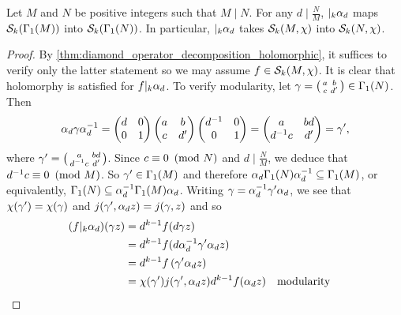     \begin{proposition}\label{equ:lifting_operator_holomorphic}
      Let $M$ and $N$ be positive integers such that $M \mid N$. For any $d \mid \frac{N}{M}$, $|_{k}\alpha_{d}$ maps $\mathcal{S}_{k}(\Gamma_{1}(M))$ into $\mathcal{S}_{k}(\Gamma_{1}(N))$. In particular, $|_{k}\alpha_{d}$ takes $\mathcal{S}_{k}(M,\chi)$ into $\mathcal{S}_{k}(N,\chi)$.
    \end{proposition}
    \begin{proof}
      By \cref{thm:diamond_operator_decomposition_holomorphic}, it suffices to verify only the latter statement so we may assume $f \in \mathcal{S}_{k}(M,\chi)$. It is clear that holomorphy is satisfied for $f|_{k}\alpha_{d}$. To verify modularity, let $\gamma = \begin{psmallmatrix} a & b \\ c & d' \end{psmallmatrix} \in \Gamma_{1}(N)$. Then
      \[
        \alpha_{d}\gamma\alpha_{d}^{-1} = \begin{pmatrix} d & 0 \\ 0 & 1 \end{pmatrix}\begin{pmatrix} a & b \\ c & d' \end{pmatrix}\begin{pmatrix} d^{-1} & 0 \\ 0 & 1 \end{pmatrix} = \begin{pmatrix} a & bd \\ d^{-1}c & d' \end{pmatrix} = \gamma',
      \]
      where $\gamma' = \begin{psmallmatrix} a & bd \\ d^{-1}c & d' \end{psmallmatrix}$. Since $c \equiv 0 \ \left(\text{mod }N\right)$ and $d \mid \frac{N}{M}$, we deduce that $d^{-1}c \equiv 0 \ \left(\text{mod }M\right)$. So $\gamma' \in \Gamma_{1}(M)$ and therefore $\alpha_{d}\Gamma_{1}(N)\alpha_{d}^{-1} \subseteq \Gamma_{1}(M)$, or equivalently, $\Gamma_{1}(N) \subseteq \alpha_{d}^{-1}\Gamma_{1}(M)\alpha_{d}$. Writing $\gamma = \alpha_{d}^{-1}\gamma'\alpha_{d}$, we see that $\chi(\gamma') = \chi(\gamma)$ and $j(\gamma',\alpha_{d}z) = j(\gamma,z)$ and so
      \begin{align*}
        (f|_{k}\a_{d})(\g z) &= d^{k-1}f(d \g z) \\
        &= d^{k-1}f(d\a_{d}^{-1}\g'\a_{d}z) \\
        &= d^{k-1}f\left(\g'\a_{d}z\right) \\
        &= \chi(\g')j(\g',\a_{d}z)d^{k-1}f(\a_{d}z) && \text{modularity} \\

\end{align*}
\end{proof}
